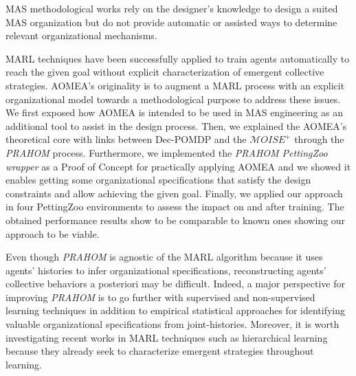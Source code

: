 MAS methodological works rely on the designer's knowledge to design a suited MAS organization but do not provide automatic or assisted ways to determine relevant organizational mechanisms.

MARL techniques have been successfully applied to train agents automatically to reach the given goal without explicit characterization of emergent collective strategies.
AOMEA's originality is to augment a MARL process with an explicit organizational model towards a methodological purpose to address these issues. We first exposed how AOMEA is intended to be used in MAS engineering as an additional tool to assist in the design process.
Then, we explained the AOMEA's theoretical core with links between Dec-POMDP and the $\mathcal{M}OISE^+$ through the \emph{PRAHOM} process.
Furthermore, we implemented the \emph{PRAHOM PettingZoo wrapper} as a Proof of Concept for practically applying AOMEA and we showed it enables getting some organizational specifications that satisfy the design constraints and allow achieving the given goal.
Finally, we applied our approach in four PettingZoo environments to assess the impact on and after training. The obtained performance results show to be comparable to known ones showing our approach to be viable.

Even though \emph{PRAHOM} is agnostic of the MARL algorithm because it uses agents' histories to infer organizational specifications, reconstructing agents' collective behaviors a posteriori may be difficult. Indeed, a major perspective for improving \emph{PRAHOM} is to go further with supervised and non-supervised learning techniques in addition to empirical statistical approaches for identifying valuable organizational specifications from joint-histories. Moreover, it is worth investigating recent works in MARL techniques such as hierarchical learning because they already seek to characterize emergent strategies throughout learning.